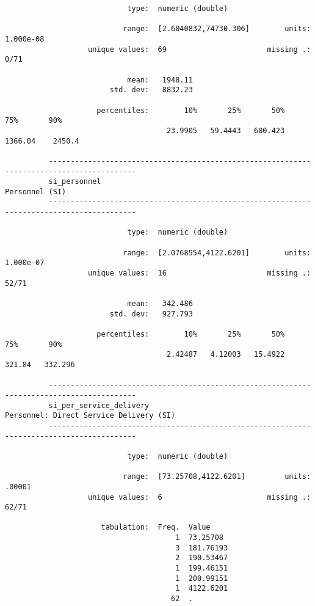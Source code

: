 \documentclass{article}
\begin{document}
\begin{verbatim}
                            type:  numeric (double)
          
                           range:  [2.6040832,74730.306]        units:  1.000e-08
                   unique values:  69                       missing .:  0/71
          
                            mean:   1948.11
                        std. dev:   8832.23
          
                     percentiles:        10%       25%       50%       75%       90%
                                     23.9905   59.4443   600.423   1366.04    2450.4
          
          ------------------------------------------------------------------------------------------
          si_personnel                                                                Personnel (SI)
          ------------------------------------------------------------------------------------------
          
                            type:  numeric (double)
          
                           range:  [2.0768554,4122.6201]        units:  1.000e-07
                   unique values:  16                       missing .:  52/71
          
                            mean:   342.486
                        std. dev:   927.793
          
                     percentiles:        10%       25%       50%       75%       90%
                                     2.42487   4.12003   15.4922    321.84   332.296
          
          ------------------------------------------------------------------------------------------
          si_per_service_delivery                            Personnel: Direct Service Delivery (SI)
          ------------------------------------------------------------------------------------------
          
                            type:  numeric (double)
          
                           range:  [73.25708,4122.6201]         units:  .00001
                   unique values:  6                        missing .:  62/71
          
                      tabulation:  Freq.  Value
                                       1  73.25708
                                       3  181.76193
                                       2  190.53467
                                       1  199.46151
                                       1  200.99151
                                       1  4122.6201
                                      62  .
          

\end{verbatim}
\end{document}
